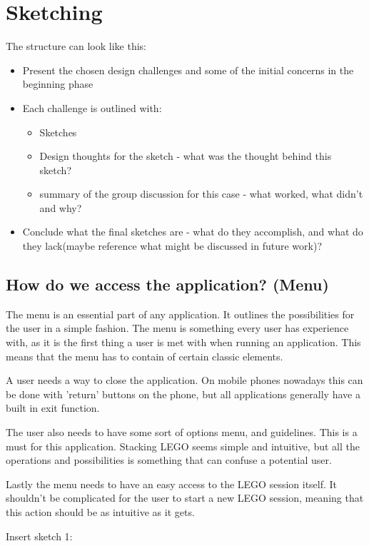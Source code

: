 \section{Sketching}
The structure can look like this:
\begin{itemize}
	\item Present the chosen design challenges and some of the initial concerns in the beginning phase
	\item Each challenge is outlined with:
		\begin{itemize}
			\item Sketches
			\item Design thoughts for the sketch - what was the thought behind this sketch?
			\item summary of the group discussion for this case - what worked, what didn't and why?
		\end{itemize}
	\item Conclude what the final sketches are - what do they accomplish, and what do they lack(maybe reference what might be discussed in future work)?
\end{itemize}
\subsection{How do we access the application? (Menu)}
The menu is an essential part of any application. It outlines the possibilities for the user in a simple fashion. The menu is something every user has experience with, as it is the first thing a user is met with when running an application. This means that the menu has to contain of certain classic elements.\par A user needs a way to close the application. On mobile phones nowadays this can be done with 'return' buttons on the phone, but all applications generally have a built in exit function.\par
The user also needs to have some sort of options menu, and guidelines. This is a must for this application. Stacking LEGO seems simple and intuitive, but all the operations and possibilities is something that can confuse a potential user. \par
Lastly the menu needs to have an easy access to the LEGO session itself. It shouldn't be complicated for the user to start a new LEGO session, meaning that this action should be as intuitive as it gets.\par
\begin{center}
	Insert sketch 1:
\end{center}

